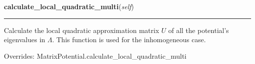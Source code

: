     \vspace{0.5ex}

\hspace{.8\funcindent}\begin{boxedminipage}{\funcwidth}

    \raggedright \textbf{calculate\_local\_quadratic\_multi}(\textit{self})

    \vspace{-1.5ex}

    \rule{\textwidth}{0.5\fboxrule}
\setlength{\parskip}{2ex}
    Calculate the local quadratic approximation matrix $U$ of all the
    potential's eigenvalues in $\Lambda$. This function is
    used for the inhomogeneous case.

\setlength{\parskip}{1ex}


      Overrides: MatrixPotential.calculate\_local\_quadratic\_multi

    \end{boxedminipage}

    \vspace{0.5ex}

